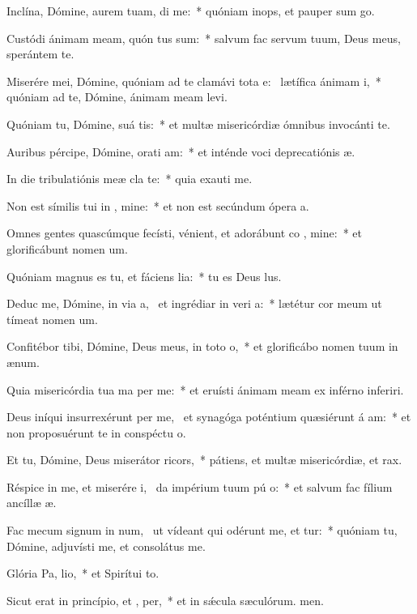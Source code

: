\item Inclína, Dómine, aurem tuam,  di me:~* quóniam inops, et pauper sum go.
\item Custódi ánimam meam, quón tus sum:~* salvum fac servum tuum, Deus meus, sperántem  te.
\item Miserére mei, Dómine, quóniam ad te clamávi tota e:~\pscross{} lætífica ánimam  i,~* quóniam ad te, Dómine, ánimam meam levi.
\item Quóniam tu, Dómine, suá  tis:~* et multæ misericórdiæ ómnibus invocánti te.
\item Auribus pércipe, Dómine, orati am:~* et inténde voci deprecatiónis æ.
\item In die tribulatiónis meæ cla  te:~* quia exauti me.
\item Non est símilis tui in , mine:~* et non est secúndum ópera a.
\item Omnes gentes quascúmque fecísti, vénient, et adorábunt co , mine:~* et glorificábunt nomen um.
\item Quóniam magnus es tu, et fáciens lia:~* tu es Deus lus.
\item Deduc me, Dómine, in via a,~\pscross{} et ingrédiar in veri a:~* lætétur cor meum ut tímeat nomen um.
\item Confitébor tibi, Dómine, Deus meus, in toto  o,~* et glorificábo nomen tuum in ænum.
\item Quia misericórdia tua ma  per me:~* et eruísti ánimam meam ex inférno inferiri.
\item Deus iníqui insurrexérunt per me,~\pscross{} et synagóga poténtium quæsiérunt á am:~* et non proposuérunt te in conspéctu o.
\item Et tu, Dómine, Deus miserátor  ricors,~* pátiens, et multæ misericórdiæ, et rax.
\item Réspice in me, et miserére i,~\pscross{} da impérium tuum pú o:~* et salvum fac fílium ancíllæ æ.
\item Fac mecum signum in num,~\pscross{} ut vídeant qui odérunt me, et tur:~* quóniam tu, Dómine, adjuvísti me, et consolátus  me.
\item Glória Pa,  lio,~* et Spirítui to.
\item Sicut erat in princípio, et ,  per,~* et in sǽcula sæculórum. men.
